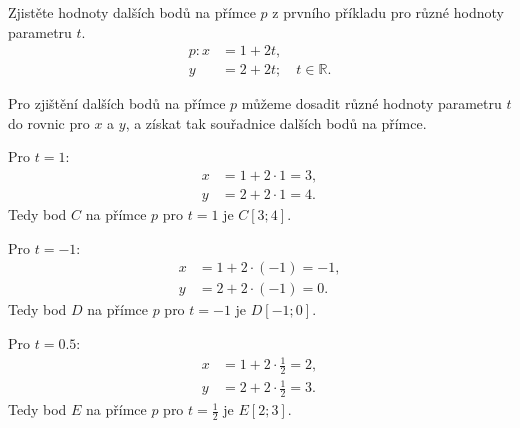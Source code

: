 \begin{example}
    Zjistěte hodnoty dalších bodů na přímce $p$ z prvního příkladu pro různé hodnoty parametru $t$.
    \begin{align*}
        p : x &= 1 + 2t, \\
            y &= 2 + 2t; \quad t \in \mathbb{R}.
    \end{align*}

    Pro zjištění dalších bodů na přímce $p$ můžeme dosadit různé hodnoty parametru $t$ do rovnic pro $x$ a $y$,
    a získat tak souřadnice dalších bodů na přímce.

    Pro $t = 1$:
    \begin{align*}
        x &= 1 + 2 \cdot 1 = 3, \\
        y &= 2 + 2 \cdot 1 = 4.
    \end{align*}
    Tedy bod $C$ na přímce $p$ pro $t=1$ je $C[3; 4]$.

    Pro $t = -1$:
    \begin{align*}
        x &= 1 + 2 \cdot (-1) = -1, \\
        y &= 2 + 2 \cdot (-1) = 0.
    \end{align*}
    Tedy bod $D$ na přímce $p$ pro $t=-1$ je $D[-1; 0]$.

    Pro $t = 0.5$:
    \begin{align*}
        x &= 1 + 2 \cdot \tfrac{1}{2} = 2, \\
        y &= 2 + 2 \cdot \tfrac{1}{2} = 3.
    \end{align*}
    Tedy bod $E$ na přímce $p$ pro $t=\frac{1}{2}$ je $E[2; 3]$.
\end{example}

